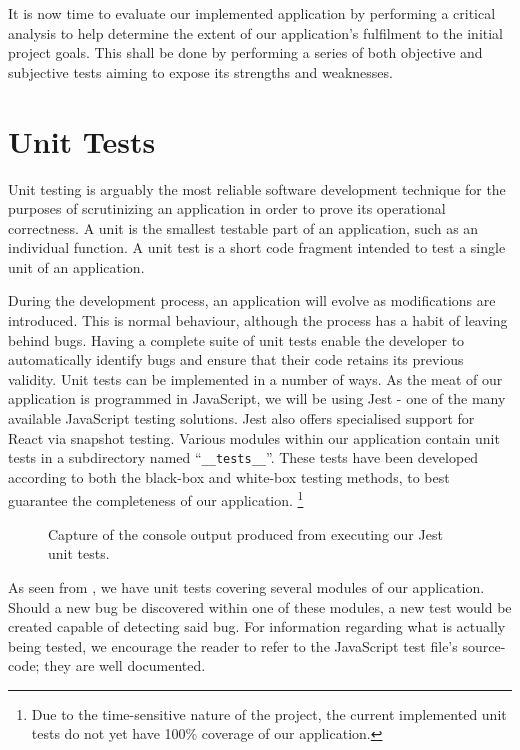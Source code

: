 \documentclass{standalone}
\begin{document}
	It is now time to evaluate our implemented application by performing a critical analysis to help determine the extent of our application's fulfilment to the initial project goals. This shall be done by performing a series of both objective and subjective tests aiming to expose its strengths and weaknesses.

	\section{Unit Tests}
		Unit testing is arguably the most reliable software development technique for the purposes of scrutinizing an application in order to prove its operational correctness. A unit is the smallest testable part of an application, such as an individual function. A unit test is a short code fragment intended to test a single unit of an application.

		During the development process, an application will evolve as modifications are introduced. This is normal behaviour, although the process has a habit of leaving behind bugs. Having a complete suite of unit tests enable the developer to automatically identify bugs and ensure that their code retains its previous validity. Unit tests can be implemented in a number of ways. As the meat of our application is programmed in JavaScript, we will be using Jest \parencite{jest} - one of the many available JavaScript testing solutions. Jest also offers specialised support for React via snapshot testing. Various modules within our application contain unit tests in a subdirectory named \enquote{\texttt{\_\_tests\_\_}}. These tests have been developed according to both the black-box and white-box testing methods, to best guarantee the completeness of our application. \footnote{Due to the time-sensitive nature of the project, the current implemented unit tests do not yet have 100\% coverage of our application.}

		\begin{figure}[!htbp]
			\begin{formal}
				
			\end{formal}
			\caption{Capture of the console output produced from executing our Jest unit tests.} \label{fig:unitTests}
		\end{figure}

		As seen from , we have unit tests covering several modules of our application. Should a new bug be discovered within one of these modules, a new test would be created capable of detecting said bug. For information regarding what is actually being tested, we encourage the reader to refer to the JavaScript test file's source-code; they are well documented.
\end{document}
